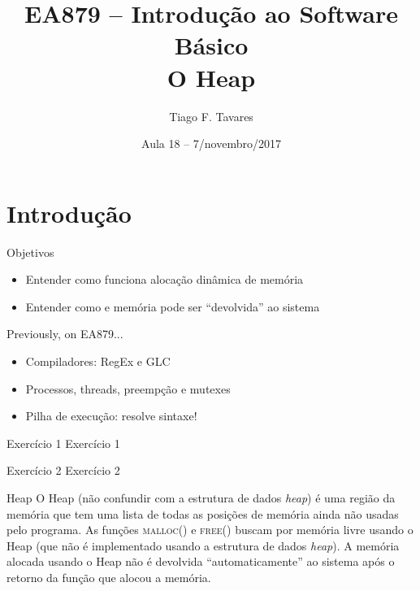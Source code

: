 \documentclass{beamer}
\title[18-Pilha]{EA879 -- Introdução ao Software
Básico\\O Heap}
\author{Tiago F. Tavares}
\institute{FEEC -- UNICAMP}
\date{Aula 18 -- 7/novembro/2017}
\begin{document}
\begin{frame}
  \titlepage
\end{frame}


\section{Introdução}

\begin{frame}{Objetivos}
  \Large
  \begin{itemize}
    \item Entender como funciona alocação dinâmica de memória
    \item Entender como e memória pode ser ``devolvida'' ao sistema
  \end{itemize}
\end{frame}

\begin{frame}[fragile]{Previously, on EA879...}
  \centering
  \Large
  \begin{itemize}
    \item Compiladores: RegEx e GLC
    \item Processos, threads, preempção e mutexes
    \item Pilha de execução: resolve sintaxe!
  \end{itemize}
\end{frame}

\begin{frame}[fragile]{Exercício 1}
  \centering
  \Large
  Exercício 1
\end{frame}

\begin{frame}[fragile]{Exercício 2}
  \centering
  \Large
  Exercício 2
\end{frame}

\begin{frame}[fragile]{Heap}
  \centering
  \Large
  O Heap (não confundir com a estrutura de dados \textit{heap}) é uma região da
  memória que tem uma lista de todas as posições de memória ainda não usadas
  pelo programa. As funções \textsc{malloc()} e \textsc{free()} buscam por
  memória livre usando o Heap (que não é implementado usando a estrutura de
  dados \textit{heap}). A memória alocada usando o Heap não é devolvida
  ``automaticamente'' ao sistema após o retorno da função que alocou a memória.
\end{frame}
\end{document}
